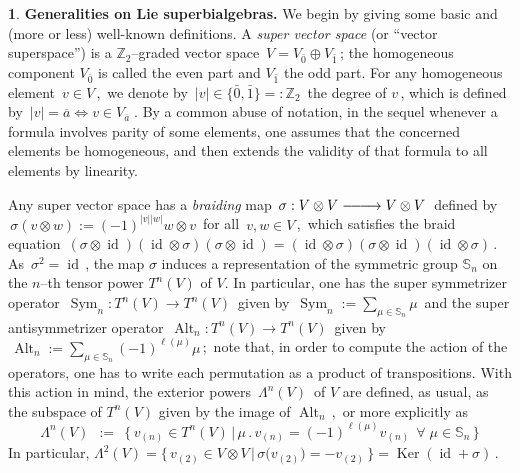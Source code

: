 \documentclass[12pt,reqno,twoside,a4paper]{amsart}
\numberwithin{equation}{section}
\theoremstyle{definition}
\newtheorem{free text}[lema]{}
\theoremstyle{remark}
\newcommand \id{\operatorname{id}}
\newcommand \Alt{\operatorname{Alt}}
\newcommand \Sym{\operatorname{Sym}}
\newcommand \Ker{\operatorname{Ker}}
\newcommand{\ot}{\otimes}
\newcommand{\zero}{{\bar{0}}}
\newcommand{\one}{{\bar{1}}}
\def \ZZ {\mathbb{Z}}
\theoremstyle{plain}
\begin{document}
\medskip

\begin{free text}  \label{gen's on LSbA's}
%
 {\bf Generalities on Lie superbialgebras.}
We begin by giving some basic and (more or less) well-known definitions.
%
 \vskip3pt
%
   A  \emph{super vector space\/}  (or ``vector superspace'') is a  $ \ZZ_2 $--graded  vector space  $ \, V = V_\zero \oplus V_\one \, $;  the homogeneous component  $ V_\zero $  is called the even part and  $ V_\one $  the odd part.  For any homogeneous element  $ \, v \in V \, $,  \,we denote by  $ \, |v| \in \{\zero,\one\} =: \ZZ_2 \, $  the degree of  $ v \,$,  which is defined by  $ \, |v| = \overline{a} \iff v \in V_{\overline{a}} \; $.  By a common abuse of notation, in the sequel whenever a formula involves parity of some elements, one assumes that the concerned elements be homogeneous, and then extends the validity of that formula to all elements by linearity.
                                                           \par
   Any super vector space has a  \textsl{braiding\/}  map $ \, \sigma: V \otimes V \relbar\joinrel\relbar\joinrel\longrightarrow V \otimes V \, $  defined by  $ \, \sigma(v \otimes w) := {(-1)}^{|v||w|} w \otimes v \, $  for all  $ \, v, w \in V \, $,  \,which satisfies the braid equation  $ \, (\sigma \ot \id)(\id \ot\sigma)(\sigma \ot \id) = (\id \ot \sigma)(\sigma \ot \id)(\id \ot\sigma) \, $.  As  $ \, \sigma^2 = \id \, $,  the map  $ \sigma $  induces a representation of the symmetric group  $ \mathbb{S}_n $  on the  $ n $--th tensor  power  $ T^n(V) $  of  $ V $.  In particular, one has the super symmetrizer operator  $ \, \Sym_n : T^n(V) \longrightarrow T^n(V) \, $  given by  $ \, \Sym_n := \sum_{\mu \in \mathbb{S}_n} \mu \, $  and the super antisymmetrizer operator  $ \, \Alt_n : T^n(V) \longrightarrow T^n(V) \, $  given by  $ \, \Alt_n := \sum_{\mu \in \mathbb{S}_n} {(-1)}^{\ell(\mu)} \mu \, $;  \,note that, in order to compute the action of the operators, one has to write each permutation as a product of transpositions.  With this action in mind, the exterior powers  $ \, \Lambda^n(V) \, $  of  $ V $  are defined, as usual, as the subspace of  $ T^n(V) $  given by the image of  $ \Alt_n \, $,  \,or more explicitly as
  $$  \Lambda^n(V)  \,\; := \;\,  \big\{\, v_{(n)} \in T^n(V) \,\big|\, \mu\,.\,v_{(n)} = {(-1)}^{\ell(\mu)} v_{(n)} \,\; \forall \; \mu \in \mathbb{S}_n \,\big\}  $$
%
   In particular,  $ \Lambda^2(V) = \big\{\, v_{(2)} \in V \otimes V \,\big|\, \sigma\big(v_{(2)}\big) = -v_{(2)} \,\big\} = \Ker(\id + \sigma) \, $.

\end{free text}
\end{document}
